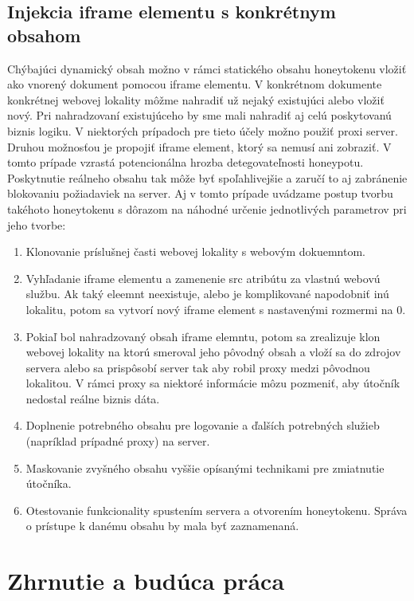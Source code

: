 \documentclass[conference, 11pt,slovak,a4paper,twoside]{IEEEtran}
\begin{document}
\subsection{Injekcia iframe elementu s konkrétnym obsahom}

Chýbajúci dynamický obsah možno v rámci statického obsahu honeytokenu vložiť ako vnorený dokument pomocou iframe elementu. V konkrétnom dokumente konkrétnej webovej lokality môžme nahradiť už nejaký existujúci alebo vložiť nový. Pri nahradzovaní existujúceho by sme mali nahradiť aj celú poskytovanú biznis logiku. V niektorých prípadoch pre tieto účely možno použiť proxi server. Druhou možnosťou je propojiť iframe element, ktorý sa nemusí ani zobraziť. V tomto prípade vzrastá potencionálna hrozba detegovateľnosti honeypotu. Poskytnutie reálneho obsahu tak môže byť spoľahlivejšie a zaručí to aj zabránenie blokovaniu požiadaviek na server. Aj v tomto prípade uvádzame postup tvorbu takéhoto honeytokenu s dôrazom na náhodné určenie jednotlivých parametrov pri jeho tvorbe:

\begin{enumerate}
	\item Klonovanie príslušnej časti webovej lokality s webovým dokuemntom.

	\item Vyhľadanie iframe elementu a zamenenie src atribútu za vlastnú webovú službu. Ak taký eleemnt neexistuje, alebo je komplikované napodobniť inú lokalitu, potom sa vytvorí nový iframe element s nastavenými rozmermi na 0.
	
	\item Pokiaľ bol nahradzovaný obsah iframe elemntu, potom sa zrealizuje klon webovej lokality na ktorú smeroval jeho pôvodný obsah a vloží sa do zdrojov servera alebo sa prispôsobí server tak aby robil proxy medzi pôvodnou lokalitou. V rámci proxy sa niektoré informácie môzu pozmeniť, aby útočník nedostal reálne biznis dáta.
	
	\item Doplnenie potrebného obsahu pre logovanie a ďalších potrebných služieb (napríklad prípadné proxy) na server.
	
	\item Maskovanie zvyšného obsahu vyššie opísanými technikami pre zmiatnutie útočníka.
	
	\item Otestovanie funkcionality spustením servera a otvorením honeytokenu. Správa o prístupe k danému obsahu by mala byť zaznamenaná.
\end{enumerate}



\section{Zhrnutie a budúca práca}



\end{document}
